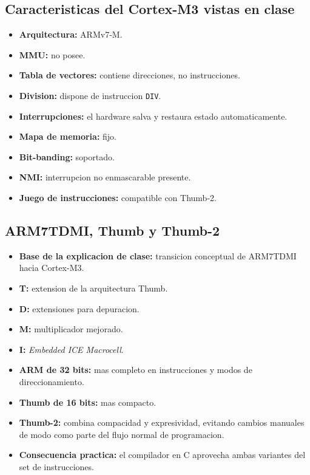 \subsection{Caracteristicas del Cortex-M3 vistas en clase}

\begin{itemize}
  \item \textbf{Arquitectura:} ARMv7-M.
  \item \textbf{MMU:} no posee.
  \item \textbf{Tabla de vectores:} contiene direcciones, no instrucciones.
  \item \textbf{Division:} dispone de instruccion \texttt{DIV}.
  \item \textbf{Interrupciones:} el hardware salva y restaura estado automaticamente.
  \item \textbf{Mapa de memoria:} fijo.
  \item \textbf{Bit-banding:} soportado.
  \item \textbf{NMI:} interrupcion no enmascarable presente.
  \item \textbf{Juego de instrucciones:} compatible con Thumb-2.
\end{itemize}

\subsection{ARM7TDMI, Thumb y Thumb-2}

\begin{itemize}
  \item \textbf{Base de la explicacion de clase:} transicion conceptual de ARM7TDMI hacia Cortex-M3.
  \item \textbf{T:} extension de la arquitectura Thumb.
  \item \textbf{D:} extensiones para depuracion.
  \item \textbf{M:} multiplicador mejorado.
  \item \textbf{I:} \textit{Embedded ICE Macrocell}.
  \item \textbf{ARM de 32 bits:} mas completo en instrucciones y modos de direccionamiento.
  \item \textbf{Thumb de 16 bits:} mas compacto.
  \item \textbf{Thumb-2:} combina compacidad y expresividad, evitando cambios manuales de modo como parte del flujo normal de programacion.
  \item \textbf{Consecuencia practica:} el compilador en C aprovecha ambas variantes del set de instrucciones.
\end{itemize}

